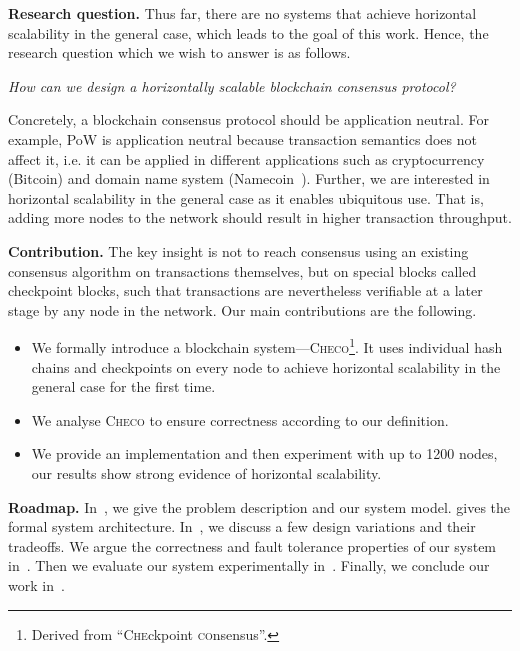 \textbf{Research question.\quad}
Thus far, there are no systems that achieve horizontal scalability in the general case,
which leads to the goal of this work.
Hence, the research question which we wish to answer is as follows.
\begin{displayquote}
    \emph{How can we design a horizontally scalable blockchain consensus protocol?}
    \end{displayquote}
Concretely, a blockchain consensus protocol should be application neutral.
For example, PoW is application neutral because transaction semantics does not affect it,
i.e. it can be applied in different applications such as cryptocurrency (Bitcoin) and domain name system (Namecoin~\cite{namecoin}).
Further, we are interested in horizontal scalability in the general case as it enables ubiquitous use.
That is, adding more nodes to the network should result in higher transaction throughput.

\textbf{Contribution.\quad}
The key insight is not to reach consensus using an existing consensus algorithm on transactions themselves,
but on special blocks called checkpoint blocks,
such that transactions are nevertheless verifiable at a later stage by any node in the network.
Our main contributions are the following.
\begin{itemize}
    \item We formally introduce a blockchain system---\textsc{Checo}\footnote{Derived from ``\textsc{Che}ckpoint \textsc{co}nsensus''.}.
        It uses individual hash chains and checkpoints on every node to achieve
        horizontal scalability in the general case for the first time.
    \item We analyse \textsc{Checo} to ensure correctness according to our definition.
    \item We provide an implementation and then experiment with up to 1200 nodes,
        our results show strong evidence of horizontal scalability.
\end{itemize}

\textbf{Roadmap.\quad}
In~,
we give the problem description and our system model.
 gives the formal system architecture.
In~, we discuss a few design variations and their tradeoffs.
We argue the correctness and fault tolerance properties of our system in~.
Then we evaluate our system experimentally in~.
Finally, we conclude our work in~.
